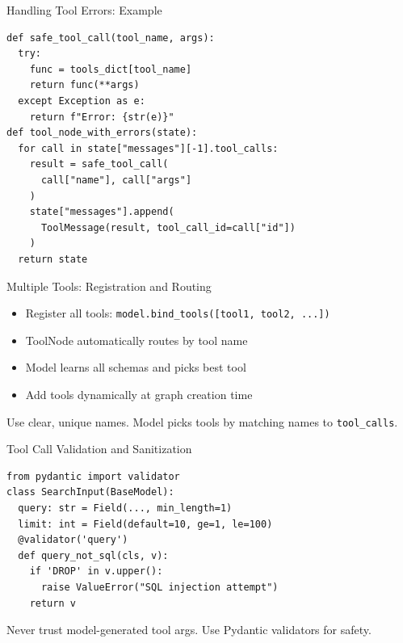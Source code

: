 \documentclass[aspectratio=169,11pt]{beamer}
\begin{document}
\begin{frame}[fragile]{Handling Tool Errors: Example}
  \begin{codebox}
    \begin{lstlisting}
def safe_tool_call(tool_name, args):
  try:
    func = tools_dict[tool_name]
    return func(**args)
  except Exception as e:
    return f"Error: {str(e)}"
def tool_node_with_errors(state):
  for call in state["messages"][-1].tool_calls:
    result = safe_tool_call(
      call["name"], call["args"]
    )
    state["messages"].append(
      ToolMessage(result, tool_call_id=call["id"])
    )
  return state
    \end{lstlisting}
  \end{codebox}
\end{frame}

\begin{frame}{Multiple Tools: Registration and Routing}
  \begin{conceptbox}
    \setlength{\itemsep}{1pt}
    \begin{itemize}
      \item Register all tools: \texttt{model.bind\_tools([tool1, tool2, ...])}
      \item ToolNode automatically routes by tool name
      \item Model learns all schemas and picks best tool
      \item Add tools dynamically at graph creation time
    \end{itemize}
  \end{conceptbox}
  \vspace{0.1cm}
  \begin{tipbox}
    Use clear, unique names. Model picks tools by matching names to \texttt{tool\_calls}.
  \end{tipbox}
\end{frame}

\begin{frame}[fragile]{Tool Call Validation and Sanitization}
  \begin{codebox}
    \begin{lstlisting}
from pydantic import validator
class SearchInput(BaseModel):
  query: str = Field(..., min_length=1)
  limit: int = Field(default=10, ge=1, le=100)
  @validator('query')
  def query_not_sql(cls, v):
    if 'DROP' in v.upper():
      raise ValueError("SQL injection attempt")
    return v
    \end{lstlisting}
  \end{codebox}
  \vspace{0.1cm}
  \begin{warningbox}
    Never trust model-generated tool args. Use Pydantic validators for safety.
  \end{warningbox}
\end{frame}
\end{document}

